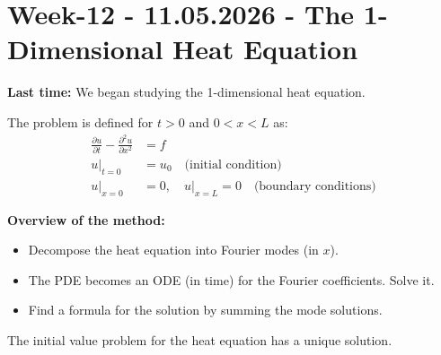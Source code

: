 \section{Week-12 - 11.05.2026 - The 1-Dimensional Heat Equation }

\textbf{Last time:} We began studying the 1-dimensional heat equation.

\begin{center}
\end{center}

\begin{definition}
The problem is defined for $t > 0$ and $0 < x < L$ as:
\begin{align*}
    \frac{\partial u}{\partial t} - \frac{\partial^2 u}{\partial x^2} &= f \\[1ex]
    u|_{t=0} &= u_0 \quad \text{(initial condition)} \\[1ex]
    u|_{x=0} &= 0, \quad u|_{x=L} = 0 \quad \text{(boundary conditions)}
\end{align*}
\end{definition}

\textbf{Overview of the method:}
\begin{itemize}
    \item Decompose the heat equation into Fourier modes (in $x$).
    \item The PDE becomes an ODE (in time) for the Fourier coefficients. Solve it.
    \item Find a formula for the solution by summing the mode solutions.
\end{itemize}

\begin{theorem}[Uniqueness]
The initial value problem for the heat equation has a unique solution.
\end{theorem}

